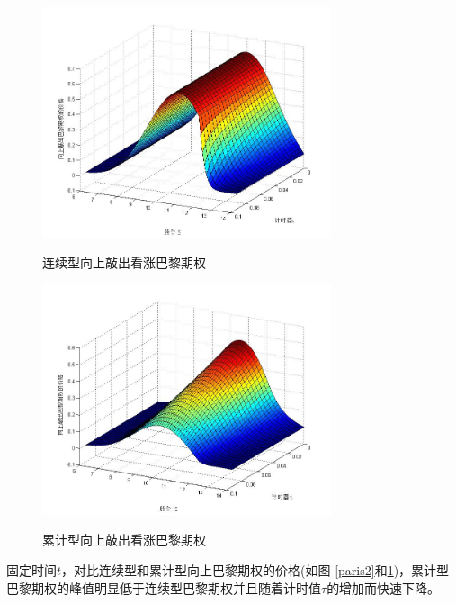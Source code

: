 \documentclass{ctexart} %
\begin{document}
\begin{figure}[H]
\begin{minipage}{0.48\linewidth}
\label{paris2}
\includegraphics[width=8.5cm]{code/paris2.jpg}
\caption{连续型向上敲出看涨巴黎期权}
\end{minipage}
\begin{minipage}{0.48\linewidth}
\label{parisc2}
\includegraphics[width=8.5cm]{code/parisc2.jpg}
\caption{累计型向上敲出看涨巴黎期权}
\end{minipage}
\end{figure}
固定时间$t$，对比连续型和累计型向上巴黎期权的价格(如图 \ref{paris2}和\ref{parisc2})，累计型巴黎期权的峰值明显低于连续型巴黎期权并且随着计时值$\tau$的增加而快速下降。
\iffalse
\end{document}
